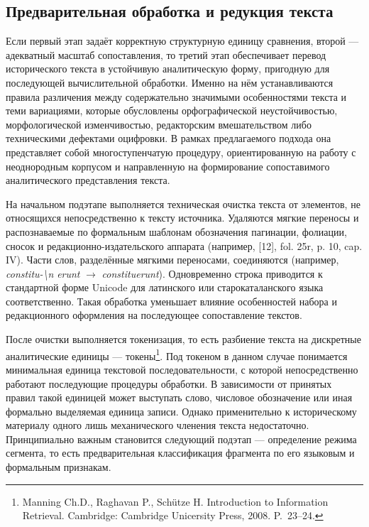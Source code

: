 \subsection{Предварительная обработка и редукция текста}

Если первый этап задаёт корректную структурную единицу сравнения, второй --- адекватный масштаб сопоставления, то третий этап обеспечивает перевод исторического текста в устойчивую аналитическую форму, пригодную для последующей вычислительной обработки. Именно на нём устанавливаются правила различения между содержательно значимыми особенностями текста и теми вариациями, которые обусловлены орфографической неустойчивостью, морфологической изменчивостью, редакторским вмешательством либо техническими дефектами оцифровки. В рамках предлагаемого подхода она представляет собой многоступенчатую процедуру, ориентированную на работу с неоднородным корпусом и направленную на формирование сопоставимого аналитического представления текста.

На начальном подэтапе выполняется техническая очистка текста от элементов, не относящихся непосредственно к тексту источника. Удаляются мягкие переносы и распознаваемые по формальным шаблонам обозначения пагинации, фолиации, сносок и редакционно-издательского аппарата (например, [12], fol. 25r, p. 10, cap. IV). Части слов, разделённые мягкими переносами, соединяются (например, \emph{constitu}\emph{-\textbackslash{}n }\emph{erunt} $\rightarrow$ \emph{constituerunt}). Одновременно строка приводится к стандартной форме Unicode для латинского или старокаталанского языка соответственно. Такая обработка уменьшает влияние особенностей набора и редакционного оформления на последующее сопоставление текстов.

После очистки выполняется токенизация, то есть разбиение текста на дискретные аналитические единицы --- токены\footnote{Manning Ch.D., Raghavan P., Schütze H. Introduction to Information Retrieval. Cambridge: Cambridge Unicersity Press, 2008. P.~23--24.}. Под токеном в данном случае понимается минимальная единица текстовой последовательности, с которой непосредственно работают последующие процедуры обработки. В зависимости от принятых правил такой единицей может выступать слово, числовое обозначение или иная формально выделяемая единица записи. Однако применительно к историческому материалу одного лишь механического членения текста недостаточно. Принципиально важным становится следующий подэтап --- определение режима сегмента, то есть предварительная классификация фрагмента по его языковым и формальным признакам.

